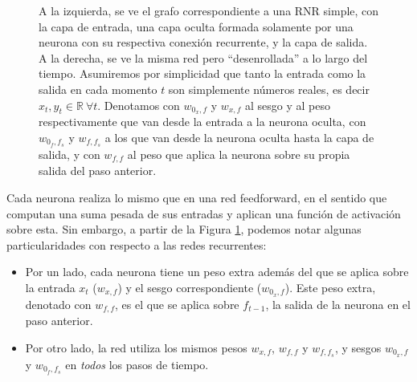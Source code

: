 \documentclass[../../main.tex]{subfiles}
\begin{document}
\begin{figure}[ht]
    \caption{A la izquierda, se ve el grafo correspondiente a una RNR simple, con la capa
    de entrada, una capa oculta formada solamente por una neurona con su respectiva
    conexión recurrente, y la capa de salida. A la derecha, se ve la misma red pero
    ``desenrollada'' a lo largo del tiempo. Asumiremos por simplicidad que tanto la
    entrada como la salida en cada momento \(t\) son simplemente números reales, es decir
    \(x_t, y_t \in \mathbb{R} \ \forall t\). Denotamos con \(w_{0_x,f}\) y \(w_{x,f}\) al
    sesgo y al peso respectivamente que van desde la entrada a la neurona oculta, con
    \(w_{0_f,f_s}\) y \(w_{f,f_s}\) a los que van desde la neurona oculta hasta la capa de
    salida, y con \(w_{f,f}\) al peso que aplica la neurona sobre su propia salida del
    paso anterior.}
    \label{fig:simple-rnn}
\end{figure}

Cada neurona realiza lo mismo que en una red feedforward, en el sentido que computan una
suma pesada de sus entradas y aplican una función de activación sobre esta. Sin embargo, a
partir de la Figura \ref{fig:simple-rnn}, podemos notar algunas particularidades con
respecto a las redes recurrentes:
\begin{itemize}
    \item Por un lado, cada neurona tiene un peso extra además del que se aplica sobre la
    entrada \(x_t\) (\(w_{x,f}\)) y el sesgo correspondiente (\(w_{0_x,f}\)). Este peso
    extra, denotado con \(w_{f,f}\), es el que se aplica sobre \(f_{t-1}\), la salida de
    la neurona en el paso anterior.
    \item Por otro lado, la red utiliza los mismos pesos \(w_{x,f}\), \(w_{f,f}\) y
    \(w_{f, f_s}\), y sesgos \(w_{0_x,f}\) y \(w_{0_f, f_s}\) en \textit{todos} los pasos
    de tiempo.
\end{itemize}
\end{document}
